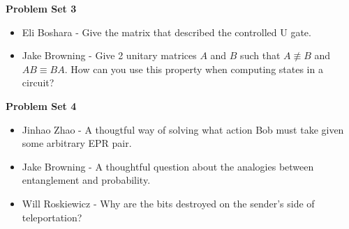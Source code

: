 \documentclass[12pt]{article}
\begin{document}
\noindent \textbf{Problem Set 3}
\begin{itemize}
    \item Eli Boshara - Give the matrix that described the controlled U gate.
    \item Jake Browning - Give 2 unitary matrices $A$ and $B$ such that $A \not\equiv B$ and $AB \equiv BA$. How can you use this property when computing states in a circuit?
\end{itemize}

\noindent \textbf{Problem Set 4}
\begin{itemize}
    \item Jinhao Zhao - A thougtful way of solving what action Bob must take given some arbitrary EPR pair.
    \item Jake Browning - A thoughtful question about the analogies between entanglement and probability.
    \item Will Roskiewicz - Why are the bits destroyed on the sender's side of teleportation? 
\end{itemize}
\end{document}
